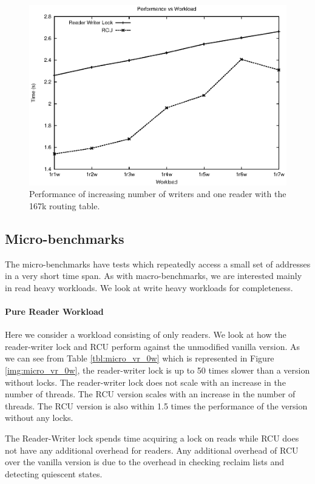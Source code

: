 \documentclass[a4paper,marginparwidth=50pt,marginparsep=10pt]{article}
\begin{document}
\begin{figure}[tph]
\includegraphics[scale = 0.7]{../images/graphs/macro_1r_vw}
\caption{Performance of increasing number of writers and one reader with the 167k routing table.}
\label{img:macro_1r_vw}
\end{figure}

\subsection{Micro-benchmarks}
\label{sec:microbenchmarks}
The micro-benchmarks have tests which repeatedly access a small set of addresses in a very short time span.
As with macro-benchmarks, we are interested mainly in read heavy workloads. We look at write heavy workloads for completeness.

\paragraph{Pure Reader Workload}
Here we consider a workload consisting of only readers. We look at how the reader-writer lock and RCU perform against the unmodified vanilla version.
As we can see from Table \ref{tbl:micro_vr_0w} which is represented in Figure \ref{img:micro_vr_0w}, the reader-writer lock is up to 50 times slower than a version without locks.
The reader-writer lock does not scale with an increase in the number of threads. The RCU version scales with an increase in the number of threads. The RCU version is also within 1.5 times the performance of the version without any locks.

The Reader-Writer lock spends time acquiring a lock on reads while RCU does not have any additional overhead for readers. Any additional overhead of RCU over the vanilla version is due to the overhead in checking reclaim lists and detecting quiescent states.
\end{document}
